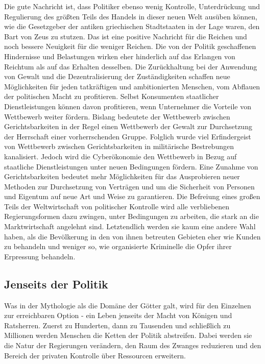 \documentclass[
  a5paper,
  smalldemyvopaper,10pt,twoside,onecolumn,openright,extrafontsizes,hidelinks]{memoir}
\begin{document}
Die gute Nachricht ist, dass Politiker ebenso wenig Kontrolle,
Unterdrückung und Regulierung des größten Teils des Handels in dieser
neuen Welt ausüben können, wie die Gesetzgeber der antiken griechischen
Stadtstaaten in der Lage waren, den Bart von Zeus zu stutzen. Das ist
eine positive Nachricht für die Reichen und noch bessere Neuigkeit für
die weniger Reichen. Die von der Politik geschaffenen Hindernisse und
Belastungen wirken eher hinderlich auf das Erlangen von Reichtum als auf
das Erhalten desselben. Die Zurückhaltung bei der Anwendung von Gewalt
und die Dezentralisierung der Zuständigkeiten schaffen neue
Möglichkeiten für jeden tatkräftigen und ambitionierten Menschen, vom
Abflauen der politischen Macht zu profitieren. Selbst Konsumenten
staatlicher Dienstleistungen können davon profitieren, wenn Unternehmer
die Vorteile von Wettbewerb weiter fördern. Bislang bedeutete der
Wettbewerb zwischen Gerichtsbarkeiten in der Regel einen Wettbewerb der
Gewalt zur Durchsetzung der Herrschaft einer vorherrschenden Gruppe.
Folglich wurde viel Erfindergeist von Wettbewerb zwischen
Gerichtsbarkeiten in militärische Bestrebungen kanalisiert. Jedoch wird
die Cyberökonomie den Wettbewerb in Bezug auf staatliche
Dienstleistungen unter neuen Bedingungen fördern. Eine Zunahme von
Gerichtsbarkeiten bedeutet mehr Möglichkeiten für das Ausprobieren neuer
Methoden zur Durchsetzung von Verträgen und um die Sicherheit von
Personen und Eigentum auf neue Art und Weise zu garantieren. Die
Befreiung eines großen Teils der Weltwirtschaft von politischer
Kontrolle wird alle verbliebenen Regierungsformen dazu zwingen, unter
Bedingungen zu arbeiten, die stark an die Marktwirtschaft angelehnt
sind. Letztendlich werden sie kaum eine andere Wahl haben, als die
Bevölkerung in den von ihnen betreuten Gebieten eher wie Kunden zu
behandeln und weniger so, wie organisierte Kriminelle die Opfer ihrer
Erpressung behandeln.

\subsection{Jenseits der Politik}\label{jenseits-der-politik}

Was in der Mythologie als die Domäne der Götter galt, wird für den
Einzelnen zur erreichbaren Option - ein Leben jenseits der Macht von
Königen und Ratsherren. Zuerst zu Hunderten, dann zu Tausenden und
schließlich zu Millionen werden Menschen die Ketten der Politik
abstreifen. Dabei werden sie die Natur der Regierungen verändern, den
Raum des Zwanges reduzieren und den Bereich der privaten Kontrolle über
Ressourcen erweitern.
\end{document}
